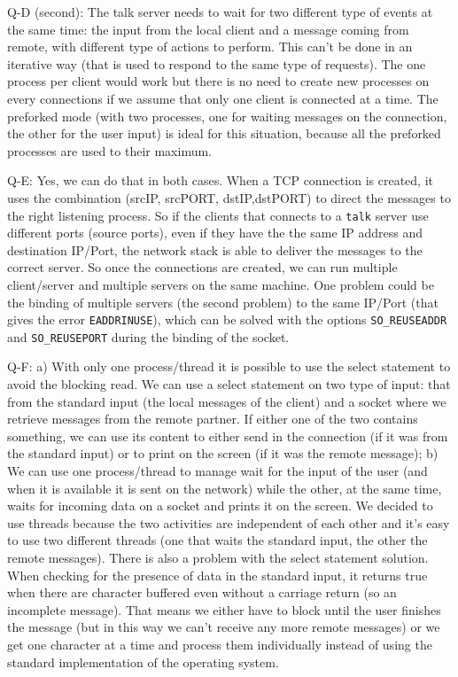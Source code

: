 Q-D (second): The talk server needs to wait for two different type of events at the same time: the input from the local client and a message coming from remote, with different type of actions to perform. This can't be done in an iterative way (that is used to respond to the same type of requests). The one process per client would work but there is no need to create new processes on every connections if we assume that only one client is connected at a time. The preforked mode (with two processes, one for waiting messages on the connection, the other for the user input) is ideal for this situation, because all the preforked processes are used to their maximum. \newline

Q-E: Yes, we can do that in both cases. When a TCP connection is created, it uses the combination (srcIP, srcPORT, dstIP,dstPORT) to direct the messages to the right listening process. So if the clients that connects to a \texttt{talk} server use different ports (source ports), even if they have the the same IP address and destination IP/Port, the network stack is able to deliver the messages to the correct server. So once the connections are created, we can run multiple client/server and multiple servers on the same machine. One problem could be the binding of multiple servers (the second problem) to the same IP/Port (that gives the error \texttt{EADDRINUSE}), which can be solved with the options \texttt{SO\_REUSEADDR} and \texttt{SO\_REUSEPORT} during the binding of the socket. \newline

Q-F: a) With only one process/thread it is possible to use the select statement to avoid the blocking read. We can use a select statement on two type of input: that from the standard input (the local messages of the client) and a socket where we retrieve messages from the remote partner. If either one of the two contains something, we can use its content to either send in the connection (if it was from the standard input) or to print on the screen (if it was the remote message);
b) We can use one process/thread to manage wait for the input of the user (and when it is available it is sent on the network) while the other, at the same time, waits for incoming data on a socket and prints it on the screen.
We decided to use threads because the two activities are independent of each other and it's easy to use two different threads (one that waits the standard input, the other the remote messages). There is also a problem with the select statement solution. When checking for the presence of data in the standard input, it returns true when there are character buffered even without a carriage return (so an incomplete message). That means we either have to block until the user finishes the message (but in this way we can't receive any more remote messages) or we get one character at a time and process them individually instead of using the standard implementation of the operating system.


